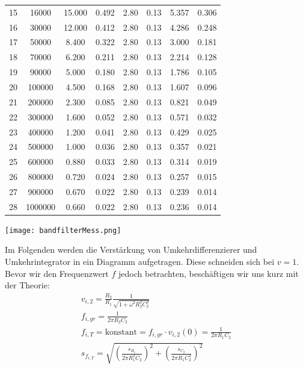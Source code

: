 \begin{center}
\begin{tabular}{l | c c c c c | c c}
        15 &    16000 &  15.000 &      0.492 &    2.80 &       0.13 &  5.357 &  0.306 \\
        16 &    30000 &  12.000 &      0.412 &    2.80 &       0.13 &  4.286 &  0.248 \\
        17 &    50000 &   8.400 &      0.322 &    2.80 &       0.13 &  3.000 &  0.181 \\
        18 &    70000 &   6.200 &      0.211 &    2.80 &       0.13 &  2.214 &  0.128 \\
        19 &    90000 &   5.000 &      0.180 &    2.80 &       0.13 &  1.786 &  0.105 \\
        20 &   100000 &   4.500 &      0.168 &    2.80 &       0.13 &  1.607 &  0.096 \\
        21 &   200000 &   2.300 &      0.085 &    2.80 &       0.13 &  0.821 &  0.049 \\
        22 &   300000 &   1.600 &      0.052 &    2.80 &       0.13 &  0.571 &  0.032 \\
        23 &   400000 &   1.200 &      0.041 &    2.80 &       0.13 &  0.429 &  0.025 \\
        24 &   500000 &   1.000 &      0.036 &    2.80 &       0.13 &  0.357 &  0.021 \\
        25 &   600000 &   0.880 &      0.033 &    2.80 &       0.13 &  0.314 &  0.019 \\
        26 &   800000 &   0.720 &      0.024 &    2.80 &       0.13 &  0.257 &  0.015 \\
        27 &   900000 &   0.670 &      0.022 &    2.80 &       0.13 &  0.239 &  0.014 \\
        28 &  1000000 &   0.660 &      0.022 &    2.80 &       0.13 &  0.236 &  0.014 \\
    \end{tabular}
    \label{tab:bandpass}
\end{center}
\newpage
\begin{center}
    \texttt{[image: bandfilterMess.png]} 
    \label{abb:bandpass}
\end{center}
\newpage
Im Folgenden werden die Verstärkung von Umkehrdifferenzierer und Umkehrintegrator in ein Diagramm aufgetragen. Diese schneiden sich bei $v = 1$.\\
Bevor wir den Frequenzwert $f$ jedoch betrachten, beschäftigen wir uns kurz mit der Theorie:\newline
\begin{gather}
    v_{i,2} = \frac{R_2}{R_1}\frac{1}{\sqrt{1+\omega ^2 R_{2}^2C_{2}^2}}\\
    f_{i,gr} = \frac{1}{2 \pi R_2 C_2}\\
    f_{i,T} = \text{konstant} = f_{i,gr} \cdot v_{i,2}(0) = \frac{1}{2\pi R_1 C_2 }\\
    s_{f_{i,T}} = \sqrt{(\frac{s_{R_1}}{2 \pi R_{1}^2 C_2})^2+ (\frac{s_{C_2}}{2 \pi R_{1} C_{2}^2})^2}
\end{gather}

